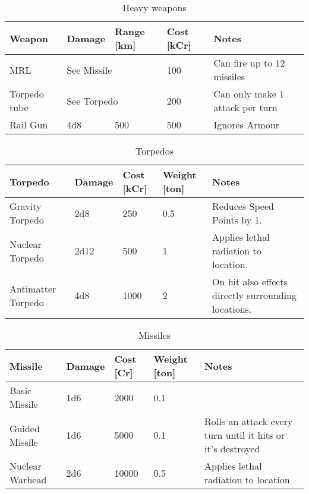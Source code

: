 \begin{table}[H]
  \centering
  \caption{Heavy weapons}
  \begin{tabularx}{\textwidth}{|l|l|p{1.1cm}|p{1.2cm}|X|}
    \hline
    Weapon       & Damage      & Range [km]       & Cost [kCr]  & Notes                           \\ \hline
    MRL          & \multicolumn{2}{l|}{See Missile} & 100       & Can fire up to 12 missiles      \\ \hline
    Torpedo tube & \multicolumn{2}{l|}{See Torpedo} & 200       & Can only make 1 attack per turn \\ \hline
    Rail Gun     & 4d8         & 500      & 500           & Ignores Armour                  \\ \hline
  \end{tabularx}
\end{table}

\begin{table}
  \centering
  \caption{Torpedos}
    \begin{tabularx}{\textwidth}{|l|l|p{1.1cm}|p{1.2cm}|X|}
    \hline
    Torpedo            & Damage & Cost [kCr] & Weight [ton] & Notes                                               \\ \hline
    Gravity Torpedo    & 2d8    & 250        & 0.5             & Reduces Speed Points by 1.                          \\ \hline
    Nuclear Torpedo    & 2d12   & 500        & 1             & Applies lethal radiation to location.               \\ \hline
    Antimatter Torpedo & 4d8    & 1000       & 2             & On hit also effects directly surrounding locations. \\ \hline
  \end{tabularx}
\end{table}

\begin{table}
  \centering
  \caption{Missiles}
    \begin{tabularx}{\textwidth}{|l|l|p{1.1cm}|p{1.2cm}|X|}
    \hline
    Missile         & Damage & Cost [Cr] & Weight [ton] & Notes                                                      \\ \hline
    Basic Missile   & 1d6    & 2000      & 0.1     & ~                                                          \\ \hline
    Guided Missile  & 1d6    & 5000      & 0.1     & Rolls an attack every turn until it hits or it's destroyed \\ \hline
    Nuclear Warhead & 2d6    & 10000     & 0.5     & Applies lethal radiation to location                       \\ \hline
  \end{tabularx}
\end{table}

